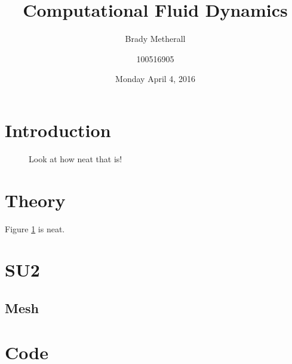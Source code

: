 \documentclass[10pt]{article}
\title{Computational Fluid Dynamics}
\author{Brady Metherall \and 100516905}
\date{Monday April 4, 2016}
\begin{document}
\maketitle
\setlength\parindent{0pt}
\lstset{language=myMMA}

\section{Introduction}

\begin{figure}[h]
\label{airfoilanimation}
\centering
{}
\caption{Look at how neat that is!}
\end{figure}

\section{Theory}

Figure \ref{airfoilanimation} is neat.

\section{SU2}

\subsection{Mesh}

\section{Code}
\end{document}
